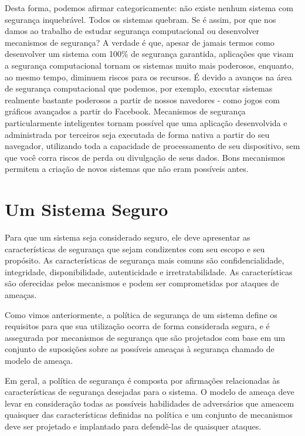 \documentclass[
	10pt,				%
	openright,			%
	twoside,			%
	a5paper,			%
	english,			%
	french,				%
	spanish,			%
	brazil,				%
	sumario=tradicional
]{abntex2}
\begin{document}
Desta forma, podemos afirmar categoricamente: não existe nenhum sistema com segurança inquebrável. Todos os sistemas quebram. Se é assim, por que nos damos ao trabalho de estudar segurança computacional ou desenvolver mecanismos de segurança? A verdade é que, apesar de jamais termos como desenvolver um sistema com 100\% de segurança garantida, aplicações que visam a segurança computacional tornam os sistemas muito mais poderosos, enquanto, ao mesmo tempo, diminuem riscos para os recursos. É devido a avanços na área de segurança computacional que podemos, por exemplo, executar sistemas realmente bastante poderosos a partir de nossos navedores - como jogos com gráficos avançados a partir do Facebook. Mecanismos de segurança particularmente inteligentes tornam possível que uma aplicação desenvolvida e administrada por terceiros seja executada de forma nativa a partir do seu navegador, utilizando toda a capacidade de processamento de seu dispositivo, sem que você corra riscos de perda ou divulgação de seus dados. Bons mecanismos permitem a criação de novos sistemas que não eram possíveis antes.

\chapter{Um Sistema Seguro}

Para que um sistema seja considerado seguro, ele deve apresentar as características de segurança que sejam condizentes com seu escopo e seu propósito. As características de segurança mais comuns são confidencialidade, integridade, disponibilidade, autenticidade e irretratabilidade. As características são oferecidas pelos mecanismos e podem ser comprometidas por ataques de ameaças.

Como vimos anteriormente, a política de segurança de um sistema define os requisitos para que sua utilização ocorra de forma considerada segura,  e é assegurada por mecanismos de segurança que são projetados com base em um conjunto de suposições sobre as possíveis ameaças à segurança chamado de modelo de ameaça.

Em geral, a política de segurança é composta por afirmações relacionadas às características de segurança desejadas para o sistema. O modelo de ameaça deve levar en consideração todas as possíveis habilidades de adversários que ameacem quaisquer das características definidas na política e um conjunto de mecanismos deve ser projetado e implantado para defendê-las de quaisquer ataques.
\end{document}
